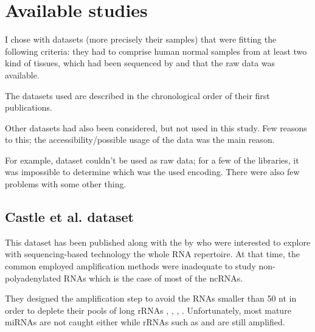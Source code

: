 \section{Available studies}
\label{sec:Trans_AvailableStudies}

I chose with datasets (more precisely their samples) that were fitting the
following criteria: they had to comprise human normal samples from at least
two kind of tissues, which had been sequenced by \Rnaseq and that the raw data was
available.

The datasets used are described in the chronological order of their first publications.

Other datasets had also been considered, but not used in this study. Few reasons to
this; the accessibility/possible usage of the data was the main reason.

For example, \citet{Burge} dataset couldn't be used as raw data; for a few of the
libraries, it was impossible to determine which was the used encoding. There were
also few problems with some other thing.

\begin{comment}
\rough{Dataset: \begin{itemize}
        \item why?
        \item Main findings (particularly the ones that impact me)
        \item how they created it
\end{itemize}}
\end{comment}

\subsection{Castle et al. dataset}

This dataset has been published along with the 
by \citet*{castleData} who were interested to explore
with sequencing-based technology the whole RNA repertoire. At that time, the common
employed amplification methods were inadequate to study non-polyadenylated
\glspl{RNA} which is the case of most of the \glspl{ncRNA}.

They designed the amplification step to avoid the \glspl{RNA}
smaller than 50 \gls{nt} in order to deplete their pools of long
\glspl{rRNA} , , ,
. Unfortunately, most mature \glspl{miRNA} are not caught either while
\glspl{rRNA} such as  and  are still amplified.

